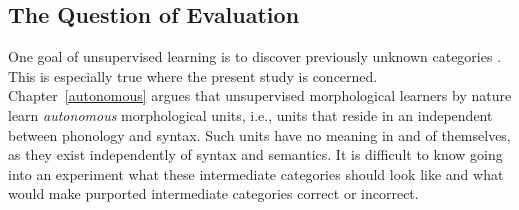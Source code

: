 
\subsection{The Question of Evaluation}  One goal of unsupervised learning is to discover previously unknown categories \citep{parsons:2004}. This is especially true where the present study is concerned. Chapter~\ref{autonomous} argues that unsupervised morphological learners by nature learn \emph{autonomous} morphological units, i.e., units that reside in an independent between phonology and syntax. Such units have no meaning in and of themselves, as they exist independently of syntax and semantics. It is difficult to know going into an experiment what these intermediate categories should look like and what would make purported intermediate categories correct or incorrect. 

%

